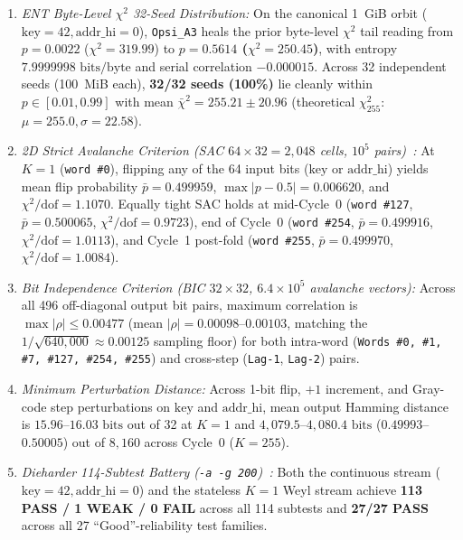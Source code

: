 \documentclass[conference]{IEEEtran}
\begin{document}
\begin{enumerate}
    \item \emph{ENT Byte-Level $\chi^2$ 32-Seed Distribution:} On the canonical 1~GiB orbit ($\text{key}=42, \text{addr\_hi}=0$), \texttt{Opsi\_A3} heals the prior byte-level $\chi^2$ tail reading from $p = 0.0022$ ($\chi^2 = 319.99$) to \textbf{$p = 0.5614$ ($\chi^2 = 250.45$)}, with entropy $7.9999998\text{ bits/byte}$ and serial correlation $-0.000015$. Across 32 independent seeds (100~MiB each), \textbf{32/32 seeds (100\%)} lie cleanly within $p \in [0.01, 0.99]$ with mean $\bar{\chi}^2 = 255.21 \pm 20.96$ (theoretical $\chi^2_{255}$: $\mu = 255.0, \sigma = 22.58$).
    \item \emph{2D Strict Avalanche Criterion (SAC $64 \times 32 = 2{,}048$ cells, $10^5$ pairs)~\cite{webster1985strict}:} At $K=1$ (\texttt{word \#0}), flipping any of the 64 input bits ($\text{key}$ or $\text{addr\_hi}$) yields mean flip probability $\bar{p} = 0.499959$, $\max |p - 0.5| = 0.006620$, and $\chi^2/\text{dof} = 1.1070$. Equally tight SAC holds at mid-Cycle~0 (\texttt{word \#127}, $\bar{p}=0.500065$, $\chi^2/\text{dof}=0.9723$), end of Cycle~0 (\texttt{word \#254}, $\bar{p}=0.499916$, $\chi^2/\text{dof}=1.0113$), and Cycle~1 post-fold (\texttt{word \#255}, $\bar{p}=0.499970$, $\chi^2/\text{dof}=1.0084$).
    \item \emph{Bit Independence Criterion (BIC $32 \times 32$, $6.4 \times 10^5$ avalanche vectors):} Across all 496 off-diagonal output bit pairs, maximum correlation is $\max |\rho| \le 0.00477$ (mean $|\rho| = 0.00098$--$0.00103$, matching the $1/\sqrt{640{,}000} \approx 0.00125$ sampling floor) for both intra-word (\texttt{Words \#0, \#1, \#7, \#127, \#254, \#255}) and cross-step (\texttt{Lag-1}, \texttt{Lag-2}) pairs.
    \item \emph{Minimum Perturbation Distance:} Across 1-bit flip, $+1$ increment, and Gray-code step perturbations on $\text{key}$ and $\text{addr\_hi}$, mean output Hamming distance is $15.96$--$16.03\text{ bits}$ out of 32 at $K=1$ and $4{,}079.5$--$4{,}080.4\text{ bits}$ ($0.49993$--$0.50005$) out of $8{,}160$ across Cycle~0 ($K=255$).
    \item \emph{Dieharder 114-Subtest Battery (\texttt{-a -g 200})~\cite{browndieharder}:} Both the continuous stream ($\text{key}=42, \text{addr\_hi}=0$) and the stateless $K=1$ Weyl stream achieve \textbf{113 PASS / 1 WEAK / 0 FAIL} across all 114 subtests and \textbf{27/27 PASS} across all 27 ``Good''-reliability test families.
\end{enumerate}
\end{document}
